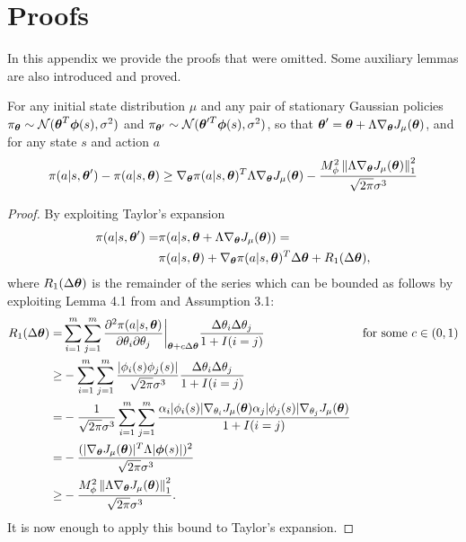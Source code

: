 \chapter{Proofs}\label{app:proofs}
In this appendix we provide the proofs that were omitted. Some auxiliary lemmas are also introduced and proved.

\begin{lemma}\label{aux:1}
For any initial state distribution $\mu$ and any pair of stationary Gaussian policies $\pi_{\vtheta} \sim \mathcal{N}(\vtheta^T\boldsymbol{\phi}(s),\sigma^2)$ and $\pi_{\vtheta'} \sim \mathcal{N}(\vtheta'^T\boldsymbol{\phi}(s),\sigma^2)$, so that $\vtheta'=\vtheta+\Lambda\gradJ{\vtheta}$, and for any state $s$ and action $a$
\[
\pi(a|s,\vtheta') - \pi(a|s,\vtheta) \geq \nabla_{\vtheta}\pi(a|s,\vtheta)^T\Lambda\gradJ{\vtheta} 
	- \frac{M_{\phi}^2\norm[1]{\Lambda\gradJ{\vtheta}}^2}{\sqrt{2\pi}\sigma^3}
\]
\end{lemma}

\begin{proof}
By exploiting Taylor's expansion
\begin{align*}
\pi(a|s,\vtheta') = & \pi(a|s,\vtheta + \Lambda\gradJ{\vtheta}) = \\
	& \pi(a|s,\vtheta) + \nabla_{\vtheta}\pi(a|s,\vtheta)^T\Delta\vtheta+R_1(\Delta\vtheta),
\end{align*}
where $R_1(\Delta\vtheta)$ is the remainder of the series which can be bounded as follows by exploiting Lemma 4.1 from \cite{NIPS2013_5186} and Assumption 3.1:
\begin{align*}
R_1(\Delta\vtheta) = & \sum\limits_{i=1}^m\sum\limits_{j=1}^m
\frac{\partial^2\pi(a|s,\vtheta)}{\partial\theta_i\partial\theta_j} \bigg|_{\vtheta+c\Delta\vtheta} \frac{\Delta\theta_i\Delta\theta_j}{1+I(i=j)} && \text{for some $c \in (0,1)$} \\
	\geq & - \sum\limits_{i=1}^m\sum\limits_{j=1}^m \frac{|\phi_i(s)\phi_j(s)|}{\sqrt{2\pi}\sigma^3}
	\frac{\Delta\theta_i\Delta\theta_j}{1+I(i=j)} \\
	= & -\frac{1}{\sqrt{2\pi}\sigma^3}\sum\limits_{i=1}^m\sum\limits_{j=1}^m
	\frac{\alpha_i|\phi_i(s)|\gradJ{\theta_i}\alpha_j|\phi_j(s)|\gradJ{\theta_j}}{1+I(i=j)} \\
	= & - \frac{(|\gradJ{\vtheta}|^T\Lambda|\vphi(s)|)^2}{\sqrt{2\pi}\sigma^3} \\
	\geq & - \frac{M_{\phi}^2\norm[1]{\Lambda\gradJ{\vtheta}}^2}{\sqrt{2\pi}\sigma^3}.
\end{align*}
It is now enough to apply this bound to Taylor's expansion.
\end{proof}

